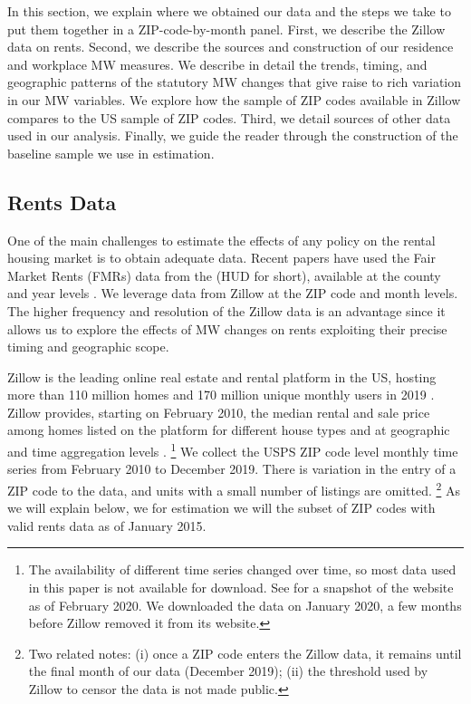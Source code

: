 
In this section, we explain where we obtained our data and the steps we take to 
put them together in a ZIP-code-by-month panel.
First, we describe the Zillow data on rents.
Second, we describe the sources and construction of our residence and workplace 
MW measures.
We describe in detail the trends, timing, and geographic patterns of the 
statutory MW changes that give raise to rich variation in our MW variables.
We explore how the sample of ZIP codes available in Zillow compares to the US 
sample of ZIP codes.
Third, we detail sources of other data used in our analysis.
Finally, we guide the reader through the construction of the baseline sample we
use in estimation.

\subsection{Rents Data}

One of the main challenges to estimate the effects of any policy on the rental
housing market is to obtain adequate data.
Recent papers have used the Fair Market Rents (FMRs) data from the 
\citeauthor{hudSAFMR} (HUD for short), available at the county and year levels 
\parencite{Tidemann2018, Yamagishi2019}.
We leverage data from Zillow at the ZIP code and month levels.
The higher frequency and resolution of the Zillow data is an advantage since it 
allows us to explore the effects of MW changes on rents exploiting their precise
timing and geographic scope. 

Zillow is the leading online real estate and rental platform in the US, hosting
more than 110 million homes and 170 million unique monthly users in 2019 
\parencite{ZillowFacts}.
Zillow provides, starting on February 2010, the median rental and sale price among 
homes listed on the platform for different house types and at geographic and 
time aggregation levels \parencite{ZillowData}.%
\footnote{The availability of different time series changed over time, so most
data used in this paper is not available for download.
See \textcite{ZillowDataArchive} for a snapshot of the website as of 
February 2020.
We downloaded the data on January 2020, a few months before Zillow removed it 
from its website.} 
We collect the USPS ZIP code level monthly time series from February 2010 to 
December 2019. 
There is variation in the entry of a ZIP code to the data, and units with a small 
number of listings are omitted.%
\footnote{Two related notes:
(i) once a ZIP code enters the Zillow data, it remains until the final month 
of our data (December 2019);
(ii) the threshold used by Zillow to censor the data is not made public.}
As we will explain below, we for estimation we will the subset of ZIP codes
with valid rents data as of January 2015.

